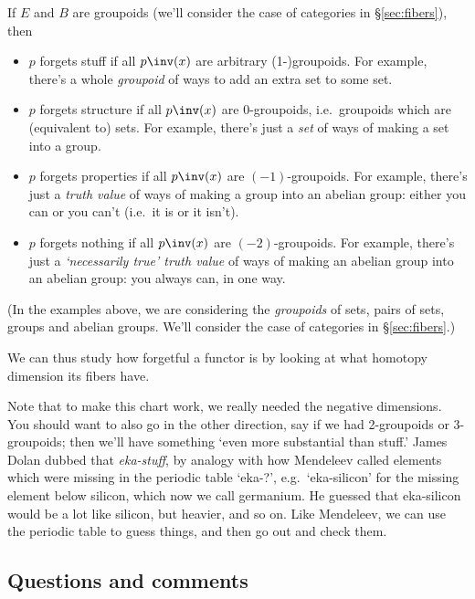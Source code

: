 \documentclass[12pt]{amsart}
\begin{document}
\begin{fact}\label{forgetfulness-by-fibers}
  If $E$ and $B$ are groupoids (we'll consider the case of categories
  in \S\ref{sec:fibers}), then
  \begin{itemize}
  \item $p$ forgets stuff if all $p\inv(x)$ are arbitrary
    (1-)groupoids.  For example, there's a whole \emph{groupoid} 
    of ways to add an extra set to some set.
  \item $p$ forgets structure if all $p\inv(x)$ are 0-groupoids,
    i.e.\ groupoids which are (equivalent to) sets.  For example, 
    there's just a \emph{set} of ways of making a set into a group.
  \item $p$ forgets properties if all $p\inv(x)$ are $(-1)$-groupoids.
    For example, there's just a \emph{truth value} of ways of making 
    a group into an abelian group: either you can or you can't 
    (i.e.\ it is or it isn't).
  \item $p$ forgets nothing if all $p\inv(x)$ are $(-2)$-groupoids.
For example, there's just a \emph{`necessarily true' truth value} of ways
of making an abelian group into an abelian group: you always can, 
in one way.
  \end{itemize}
(In the examples above, we are considering the \emph{groupoids} of
sets, pairs of sets, groups and abelian groups.
We'll consider the case of categories in \S\ref{sec:fibers}.)
\end{fact}

We can thus study how forgetful a functor is by looking at what
homotopy dimension its fibers have.

Note that to make this chart work, we really needed the negative
dimensions.  You should want to also go in the other direction, say if
we had 2-groupoids or 3-groupoids; then we'll have something `even
more substantial than stuff.'  James Dolan dubbed that \emph{eka-stuff},
by analogy with how Mendeleev called elements which were missing in
the periodic table `eka-?', e.g.\ `eka-silicon' for the missing
element below silicon, which now we call germanium.  He
guessed that eka-silicon would be a lot like silicon, but heavier, and
so on.  Like Mendeleev, we can use the periodic table to guess things,
and then go out and check them.


\subsection{Questions and comments}
\label{sec:questions-comments}
\end{document}
